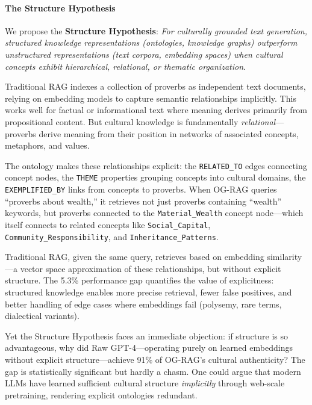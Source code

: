 \paragraph{The Structure Hypothesis}

We propose the \textbf{Structure Hypothesis}: \emph{For culturally grounded text generation, structured knowledge representations (ontologies, knowledge graphs) outperform unstructured representations (text corpora, embedding spaces) when cultural concepts exhibit hierarchical, relational, or thematic organization}.

Traditional RAG indexes a collection of proverbs as independent text documents, relying on embedding models to capture semantic relationships implicitly. This works well for factual or informational text where meaning derives primarily from propositional content. But cultural knowledge is fundamentally \emph{relational}—proverbs derive meaning from their position in networks of associated concepts, metaphors, and values.

The ontology makes these relationships explicit: the \texttt{RELATED\_TO} edges connecting concept nodes, the \texttt{THEME} properties grouping concepts into cultural domains, the \texttt{EXEMPLIFIED\_BY} links from concepts to proverbs. When OG-RAG queries ``proverbs about wealth,'' it retrieves not just proverbs containing ``wealth'' keywords, but proverbs connected to the \texttt{Material\_Wealth} concept node—which itself connects to related concepts like \texttt{Social\_Capital}, \texttt{Community\_Responsibility}, and \texttt{Inheritance\_Patterns}.

Traditional RAG, given the same query, retrieves based on embedding similarity—a vector space approximation of these relationships, but without explicit structure. The 5.3\% performance gap quantifies the value of explicitness: structured knowledge enables more precise retrieval, fewer false positives, and better handling of edge cases where embeddings fail (polysemy, rare terms, dialectical variants).

Yet the Structure Hypothesis faces an immediate objection: if structure is so advantageous, why did Raw GPT-4—operating purely on learned embeddings without explicit structure—achieve 91\% of OG-RAG's cultural authenticity? The gap is statistically significant but hardly a chasm. One could argue that modern LLMs have learned sufficient cultural structure \emph{implicitly} through web-scale pretraining, rendering explicit ontologies redundant.

